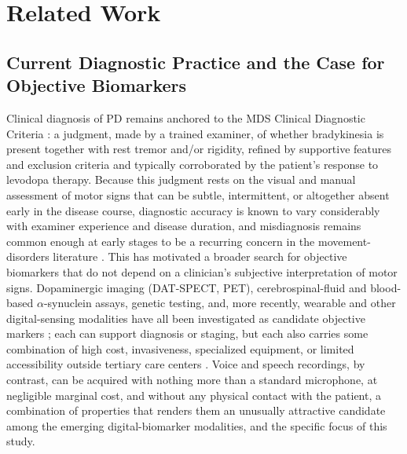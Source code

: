 \section{Related Work} \label{sec:2}

\subsection{Current Diagnostic Practice and the Case for Objective Biomarkers} \label{sec:2.1}
Clinical diagnosis of PD remains anchored to the MDS Clinical Diagnostic Criteria \cite{Postuma:2015}: a judgment, made by a trained examiner, of whether bradykinesia is present together with rest tremor and/or rigidity, refined by supportive features and exclusion criteria and typically corroborated by the patient's response to levodopa therapy. Because this judgment rests on the visual and manual assessment of motor signs that can be subtle, intermittent, or altogether absent early in the disease course, diagnostic accuracy is known to vary considerably with examiner experience and disease duration, and misdiagnosis remains common enough at early stages to be a recurring concern in the movement-disorders literature \cite{Rizzo:2016}. This has motivated a broader search for objective biomarkers that do not depend on a clinician's subjective interpretation of motor signs. Dopaminergic imaging (DAT-SPECT, PET), cerebrospinal-fluid and blood-based $\alpha$-synuclein assays, genetic testing, and, more recently, wearable and other digital-sensing modalities have all been investigated as candidate objective markers \cite{Sun:2024}; each can support diagnosis or staging, but each also carries some combination of high cost, invasiveness, specialized equipment, or limited accessibility outside tertiary care centers \cite{Sun:2024}. Voice and speech recordings, by contrast, can be acquired with nothing more than a standard microphone, at negligible marginal cost, and without any physical contact with the patient, a combination of properties that renders them an unusually attractive candidate among the emerging digital-biomarker modalities, and the specific focus of this study.

